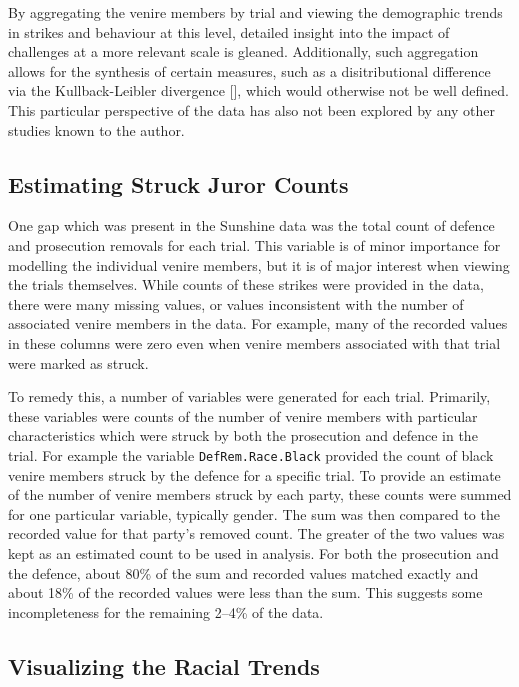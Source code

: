By aggregating the venire members by trial and viewing the demographic trends in strikes and behaviour at this level,
detailed insight into the impact of challenges at a more relevant scale is gleaned. Additionally, such aggregation allows for
the synthesis of certain measures, such as a disitributional difference via the Kullback-Leibler divergence [\cite{kullback1951}],
which would otherwise not be well defined. This particular perspective of the data has also not been explored by any other studies
known to the author.

\subsection{Estimating Struck Juror Counts} \label{subsec:struckjur}

One gap which was present in the Sunshine data was the total count of defence and prosecution removals for each trial. This
variable is of minor importance for modelling the individual venire
members, but it is of major interest when viewing the trials
themselves. While counts of these strikes were provided in the data, there were many missing values, or values inconsistent with
the number of associated venire members in the data. For example, many of the recorded values in these columns were zero even when
venire members associated with that trial were marked as struck.

To remedy this, a number of variables were generated for each trial. Primarily, these variables were counts of the number of
venire members with particular characteristics which were struck by both the prosecution and defence in the trial. For example the
variable \texttt{DefRem.Race.Black} provided the count of black venire members struck by the defence for a specific trial. To
provide an estimate of the number of venire members struck by each
party, these counts were summed for one particular
variable, typically gender. The sum was then compared to the recorded value for that party's removed count. The greater of the two
values was kept as an estimated count to be used in analysis. For both the prosecution and the defence, about 80\% of the sum and
recorded values matched exactly and about 18\% of the recorded values were less than the sum. This suggests some incompleteness
for the remaining 2--4\% of the data.

\subsection{Visualizing the Racial Trends} \label{subsec:vistrend}

